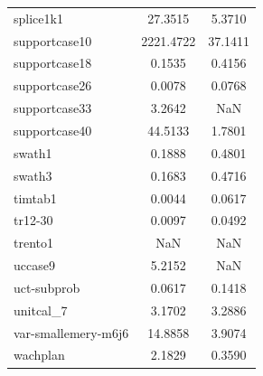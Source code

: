 \begin{longtable}{lcc}
splice1k1 & 27.3515 & 5.3710 \\
supportcase10 & 2221.4722 & 37.1411 \\
supportcase18 & 0.1535 & 0.4156 \\
supportcase26 & 0.0078 & 0.0768 \\
supportcase33 & 3.2642 & NaN \\
supportcase40 & 44.5133 & 1.7801 \\
swath1 & 0.1888 & 0.4801 \\
swath3 & 0.1683 & 0.4716 \\
timtab1 & 0.0044 & 0.0617 \\
tr12-30 & 0.0097 & 0.0492 \\
trento1 & NaN & NaN \\
uccase9 & 5.2152 & NaN \\
uct-subprob & 0.0617 & 0.1418 \\
unitcal_7 & 3.1702 & 3.2886 \\
var-smallemery-m6j6 & 14.8858 & 3.9074 \\
wachplan & 2.1829 & 0.3590 \\
\end{longtable}
